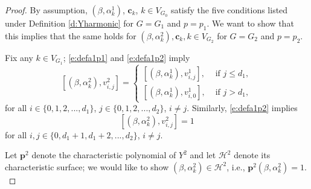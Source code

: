\documentclass[11pt,a4paper]{article}
\begin{document}
\begin{proof}
By assumption, $(\beta,\alpha_k^1)$, ${\boldsymbol c}_k$,
$k \in V_{G_0}$ satisfy the five conditions
listed under Definition \ref{d:Yharmonic} for $G=G_1$ and $p=p_1$.
We want to show that this implies that
the same holds for 
$(\beta,\alpha^2_k), {\boldsymbol c}_k, k \in V_{G_2}$  
for $G=G_2$ and $p=p_2.$ 

Fix any $k \in V_{G_1}$;
\eqref{e:defa1p1} and \eqref{e:defa1p2} imply
\begin{equation}\label{e:reduction1}
[(\beta,\alpha^2_k),v_{i,j}^2 ] 
=
\begin{cases} [(\beta,\alpha_k^1),v_{i,j}^1 ], &\text{ if }j \le d_1,\\
 [(\beta,\alpha_k^1),v_{i,0}^1 ], &\text{ if }j > d_1,
\end{cases}
\end{equation}
for all $i \in \{0,1,2,...,d_1\}$, $j \in \{0,1,2,...,d_2\}$, $i\neq j.$
Similarly,
\eqref{e:defa1p2} implies
\begin{equation}\label{e:ba1v1p3}
[(\beta,\alpha^2_k), v^2_{i,j} ] = 1
\end{equation}
for all
$i,j \in \{0,d_1 + 1,d_1 +2,...,d_2\}$, $i\neq j.$

Let ${\mathbf p}^2$ denote the characteristic polynomial of $Y^2$ and 
let ${\mathcal H}^2$ denote its characteristic surface; we would like
to show $(\beta,\alpha_k^2) \in {\mathcal H}^2$, i.e., 
${\mathbf p}^2(\beta,\alpha_k^2) = 1.$


\end{proof}
\end{document}

